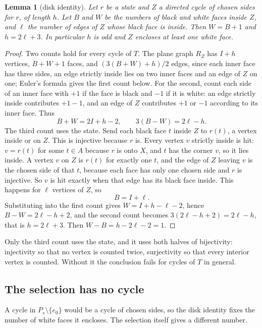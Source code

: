 \documentclass[10pt]{amsart}
\numberwithin{equation}{section}
\newtheorem{lemma}[equation]{Lemma}
\theoremstyle{definition}
\theoremstyle{remark}
\newcommand{\T}{T}
\begin{document}
\begin{lemma}[disk identity]\label{lem:disk}
Let $r$ be a state and $Z$ a directed cycle of chosen sides for $r$, of length $h$.
Let $B$ and $W$ be the numbers of black and white faces inside $Z$, and $\ell$ the number of edges of $Z$ whose black face is inside.
Then $W=B+1$ and $h=2\ell+3$.
In particular $h$ is odd and $Z$ encloses at least one white face.
\end{lemma}

\begin{proof}
Two counts hold for every cycle of $\T$.
The plane graph $R_Z$ has $I+h$ vertices, $B+W+1$ faces, and $(3(B+W)+h)/2$ edges, since each inner face has three sides, an edge strictly inside lies on two inner faces and an edge of $Z$ on one; Euler's formula gives the first count below.
For the second, count each side of an inner face with $+1$ if the face is black and $-1$ if it is white: an edge strictly inside contributes $+1-1$, and an edge of $Z$ contributes $+1$ or $-1$ according to its inner face.
Thus
\[
B+W=2I+h-2,\qquad 3(B-W)=2\ell-h .
\]
The third count uses the state.
Send each black face $t$ inside $Z$ to $r(t)$, a vertex inside or on $Z$.
This is injective because $r$ is.
Every vertex $v$ strictly inside is hit: $v=r(t)$ for some $t\in A$ because $r$ is onto $X$, and $t$ has the corner $v$, so it lies inside.
A vertex $v$ on $Z$ is $r(t)$ for exactly one $t$, and the edge of $Z$ leaving $v$ is the chosen side of that $t$, because each face has only one chosen side and $r$ is injective. So $v$ is hit exactly when that edge has its black face inside.
This happens for $\ell$ vertices of $Z$, so
\[
B=I+\ell .
\]
Substituting into the first count gives $W=I+h-\ell-2$, hence $B-W=2\ell-h+2$, and the second count becomes $3(2\ell-h+2)=2\ell-h$, that is $h=2\ell+3$. Then $W-B=h-2\ell-2=1$.
\end{proof}

Only the third count uses the state, and it uses both halves of bijectivity: injectivity so that no vertex is counted twice, surjectivity so that every interior vertex is counted.
Without it the conclusion fails for cycles of $\T$ in general.

\subsection*{The selection has no cycle}
A cycle in $P_s\setminus\{e_0\}$ would be a cycle of chosen sides, so the disk identity fixes the number of white faces it encloses.
The selection itself gives a different number.
\end{document}
